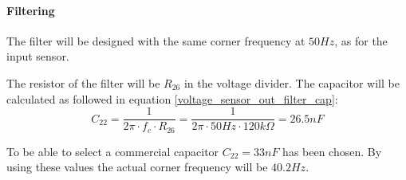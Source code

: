 \paragraph{Filtering}
The filter will be designed with the same corner frequency at $50Hz$, as for the input sensor.

The resistor of the filter will be $R_{26}$ in the voltage divider. The capacitor will be calculated as followed in equation \ref{voltage_sensor_out_filter_cap}:
\begin{equation} \label{voltage_sensor_out_filter_cap}
	C_{22} = \frac{1}{2\pi \cdot f_c \cdot R_{26}} = \frac{1}{2 \pi \cdot 50Hz \cdot 120k\Omega} = 26.5nF
\end{equation}

To be able to select a commercial capacitor $C_{22} = 33nF$ has been chosen. By using these values the actual corner frequency will be $40.2 Hz$.

